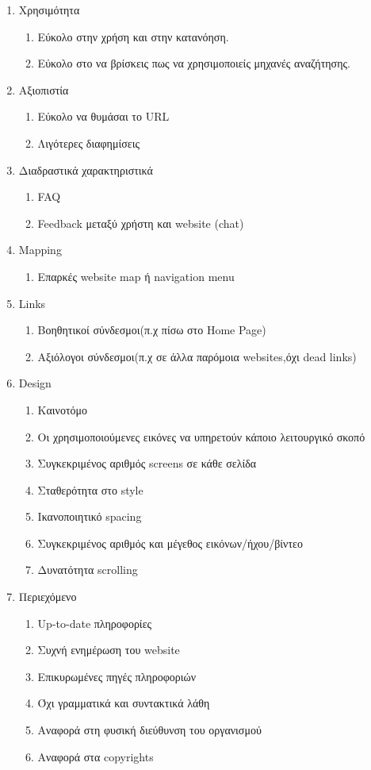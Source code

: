 \begin{enumerate}
	\item Χρησιμότητα
		\begin{enumerate}
			\item Εύκολο στην χρήση και στην κατανόηση.
			\item Εύκολο στο να βρίσκεις πως να χρησιμοποιείς μηχανές αναζήτησης.
		\end{enumerate}
	\item Αξιοπιστία
		\begin{enumerate}
			\item Εύκολο να θυμάσαι το URL
			\item Λιγότερες διαφημίσεις 
		\end{enumerate}
	\item Διαδραστικά χαρακτηριστικά
		\begin{enumerate}
			\item FAQ
			\item Feedback μεταξύ χρήστη και website (chat)
		\end{enumerate}
	\item Mapping
		\begin{enumerate}
		\item Επαρκές website map ή navigation menu
		\end{enumerate}
	\item Links
		\begin{enumerate}
			\item Βοηθητικοί σύνδεσμοι(π.χ πίσω στο Home Page)
			\item Αξιόλογοι σύνδεσμοι(π.χ σε άλλα παρόμοια websites,όχι dead links)
		\end{enumerate}
	\item Design
		\begin{enumerate}
			\item Καινοτόμο 
			\item Οι χρησιμοποιούμενες εικόνες να υπηρετούν κάποιο λειτουργικό σκοπό
			\item Συγκεκριμένος αριθμός screens σε κάθε σελίδα
			\item Σταθερότητα στο style
			\item Ικανοποιητικό spacing
			\item Συγκεκριμένος αριθμός και μέγεθος εικόνων/ήχου/βίντεο
			\item Δυνατότητα scrolling
		\end{enumerate}
	\item Περιεχόμενο
		\begin{enumerate}
			\item Up-to-date πληροφορίες
			\item Συχνή ενημέρωση του website
			\item Επικυρωμένες πηγές πληροφοριών
			\item Όχι γραμματικά και συντακτικά λάθη
			\item Αναφορά στη φυσική διεύθυνση του οργανισμού
			\item Αναφορά στα copyrights
		\end{enumerate}
\end{enumerate}